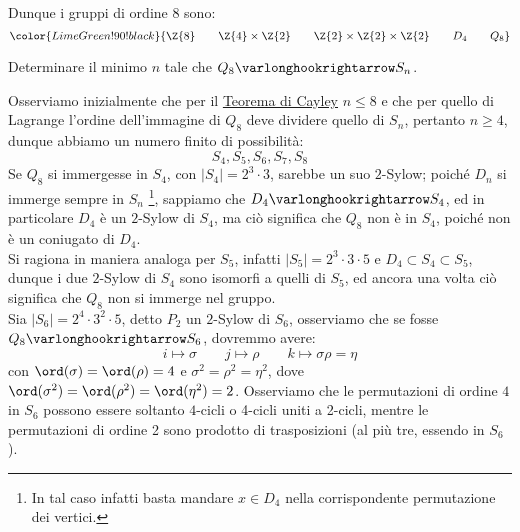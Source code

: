 \documentclass[11pt]{scrartcl}
\begin{document}
Dunque i gruppi di ordine 8 sono:
    \[ \color{LimeGreen!90!black}{\Z{8} \qquad \Z{4} \times \Z{2} \qquad \Z{2} \times \Z{2} \times \Z{2} \qquad D_4 \qquad Q_8}
        \]

\newpage
\begin{exercise}
    Determinare il minimo $n$ tale che $Q_8 \varlonghookrightarrow S_n$.
\end{exercise}

\begin{soln}
    Osserviamo inizialmente che per il \hyperref[p:Cayley]{Teorema di Cayley} $n \leq 8$ e che per quello di Lagrange l'ordine dell'immagine di $Q_8$ deve dividere quello di $S_n$, pertanto $n \geq 4$, dunque abbiamo un numero finito di possibilità:
        \[ S_4,S_5,S_6,S_7,S_8
            \]
    Se $Q_8$ si immergesse in $S_4$, con $|S_4| = 2^3 \cdot 3$, sarebbe un suo $2$-Sylow; poiché $D_n$ si immerge sempre in $S_n$ \footnote{In tal caso infatti basta mandare $x \in D_4$ nella corrispondente permutazione dei vertici.}, sappiamo che $D_4 \varlonghookrightarrow S_4$, 
    ed in particolare $D_4$ è un $2$-Sylow di $S_4$, ma ciò significa che $Q_8$ non è in $S_4$, poiché non è un coniugato di $D_4$. \\
    Si ragiona in maniera analoga per $S_5$, infatti $|S_5| = 2^3 \cdot 3 \cdot 5$ e $D_4 \subset S_4 \subset S_5$, dunque i due $2$-Sylow di $S_4$ sono isomorfi a quelli di $S_5$, ed ancora una volta ciò significa che $Q_8$ non si immerge nel gruppo.\\
    Sia $|S_6| = 2^4 \cdot 3^2 \cdot 5$, detto $P_2$ un $2$-Sylow di $S_6$, osserviamo che se fosse $Q_8 \varlonghookrightarrow S_6$, dovremmo avere:
        \[ i \longmapsto \sigma \qquad j \longmapsto \rho \qquad k \longmapsto \sigma\rho = \eta
            \]
    con $\ord(\sigma) = \ord(\rho) = 4$ e $\sigma^2 = \rho^2 = \eta^2$, dove $\ord(\sigma^2) = \ord(\rho^2) = \ord(\eta^2) = 2$. Osserviamo che le permutazioni di ordine $4$ in $S_6$ possono essere soltanto $4$-cicli o 4-cicli uniti a 2-cicli, mentre
    le permutazioni di ordine 2 sono prodotto di trasposizioni (al più tre, essendo in $S_6$).


\end{soln}
\end{document}
